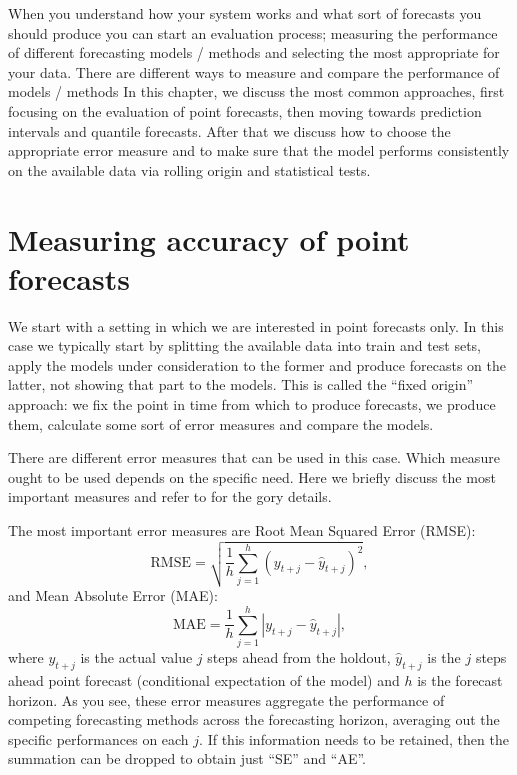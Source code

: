 \documentclass[
]{book}
\theoremstyle{definition}
\theoremstyle{definition}
\theoremstyle{definition}
\theoremstyle{definition}
\theoremstyle{remark}
\begin{document}
When you understand how your system works and what sort of forecasts you should produce you can start an evaluation process; measuring the performance of different forecasting models / methods and selecting the most appropriate for your data. There are different ways to measure and compare the performance of models / methods In this chapter, we discuss the most common approaches, first focusing on the evaluation of point forecasts, then moving towards prediction intervals and quantile forecasts. After that we discuss how to choose the appropriate error measure and to make sure that the model performs consistently on the available data via rolling origin and statistical tests.

\hypertarget{errorMeasures}{%
\section{Measuring accuracy of point forecasts}\label{errorMeasures}}

We start with a setting in which we are interested in point forecasts only. In this case we typically start by splitting the available data into train and test sets, apply the models under consideration to the former and produce forecasts on the latter, not showing that part to the models. This is called the ``fixed origin'' approach: we fix the point in time from which to produce forecasts, we produce them, calculate some sort of error measures and compare the models.

There are different error measures that can be used in this case. Which measure ought to be used depends on the specific need. Here we briefly discuss the most important measures and refer to \citep{Davydenko2013, SvetunkovAccuracy2019, SvetunkovAPEs2017} for the gory details.

The most important error measures are Root Mean Squared Error (RMSE):
\begin{equation}
    \mathrm{RMSE} = \sqrt{\frac{1}{h} \sum_{j=1}^h \left( y_{t+j} - \hat{y}_{t+j} \right)^2 },
    \label{eq:RMSE}
\end{equation}
and Mean Absolute Error (MAE):
\begin{equation}
    \mathrm{MAE} = \frac{1}{h} \sum_{j=1}^h \left| y_{t+j} - \hat{y}_{t+j} \right| ,
    \label{eq:MAE}
\end{equation}
where \(y_{t+j}\) is the actual value \(j\) steps ahead from the holdout, \(\hat{y}_{t+j}\) is the \(j\) steps ahead point forecast (conditional expectation of the model) and \(h\) is the forecast horizon. As you see, these error measures aggregate the performance of competing forecasting methods across the forecasting horizon, averaging out the specific performances on each \(j\). If this information needs to be retained, then the summation can be dropped to obtain just ``SE'' and ``AE''.
\end{document}
